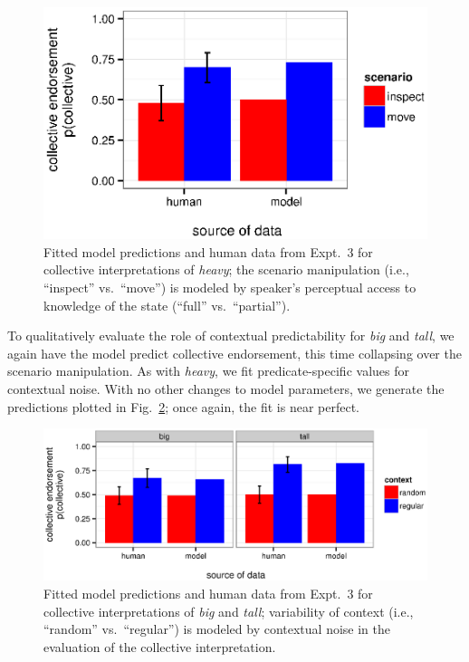 \documentclass[linguex]{sp}
\begin{document}
\begin{figure}[h]
	\centering
	\includegraphics[width=.72\linewidth]{plots/heavymodel.eps}
	\caption{Fitted model predictions and human data from Expt.~3 for collective interpretations of \emph{heavy}; the scenario manipulation (i.e., ``inspect'' vs.~``move'') is modeled by speaker's perceptual access to knowledge of the state (``full'' vs.~``partial'').} \label{heavymodel}
\end{figure}

To qualitatively evaluate the role of contextual predictability for \emph{big} and \emph{tall}, we again have the model predict collective endorsement, this time collapsing over the scenario manipulation. As with \emph{heavy}, we fit predicate-specific values for contextual noise.  With no other changes to model parameters, we generate the predictions plotted in Fig.~\ref{bigtallmodel}; once again, the fit is near perfect.

\begin{figure}[h]
	\centering
	\includegraphics[width=\linewidth]{plots/bigtallmodel.eps}
	\vspace{-20pt}
	\caption{Fitted model predictions and human data from Expt.~3 for collective interpretations of \emph{big} and \emph{tall}; variability of context (i.e., ``random'' vs.~``regular'') is modeled by contextual noise in the evaluation of the collective interpretation.} \label{bigtallmodel}
\end{figure}
\end{document}
